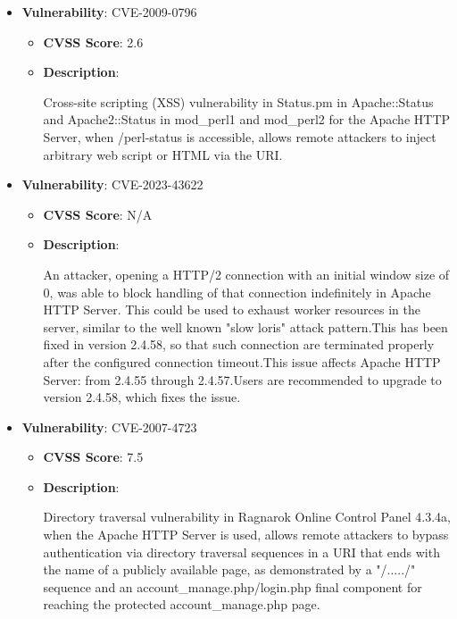 \documentclass{article}
\begin{document}
\begin{itemize}
        \item \textbf{Vulnerability}: CVE-2009-0796
        \begin{itemize}
            \item \textbf{CVSS Score}:  2.6 
            \item \textbf{Description}:
            \parbox[t]{0.9\linewidth}{
                \ttfamily Cross-site scripting (XSS) vulnerability in Status.pm in Apache::Status and Apache2::Status in mod\_perl1 and mod\_perl2 for the Apache HTTP Server, when /perl-status is accessible, allows remote attackers to inject arbitrary web script or HTML via the URI.
            }
        \end{itemize}
    
        \item \textbf{Vulnerability}: CVE-2023-43622
        \begin{itemize}
            \item \textbf{CVSS Score}:  N/A 
            \item \textbf{Description}:
            \parbox[t]{0.9\linewidth}{
                \ttfamily An attacker, opening a HTTP/2 connection with an initial window size of 0, was able to block handling of that connection indefinitely in Apache HTTP Server. This could be used to exhaust worker resources in the server, similar to the well known "slow loris" attack pattern.This has been fixed in version 2.4.58, so that such connection are terminated properly after the configured connection timeout.This issue affects Apache HTTP Server: from 2.4.55 through 2.4.57.Users are recommended to upgrade to version 2.4.58, which fixes the issue.
            }
        \end{itemize}
    
        \item \textbf{Vulnerability}: CVE-2007-4723
        \begin{itemize}
            \item \textbf{CVSS Score}:  7.5 
            \item \textbf{Description}:
            \parbox[t]{0.9\linewidth}{
                \ttfamily Directory traversal vulnerability in Ragnarok Online Control Panel 4.3.4a, when the Apache HTTP Server is used, allows remote attackers to bypass authentication via directory traversal sequences in a URI that ends with the name of a publicly available page, as demonstrated by a "/...../" sequence and an account\_manage.php/login.php final component for reaching the protected account\_manage.php page.
            }
        \end{itemize}
    

\end{itemize}
\end{document}
